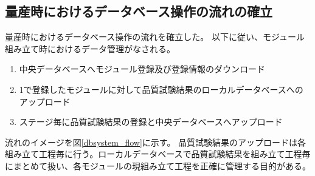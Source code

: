 \subsection{量産時におけるデータベース操作の流れの確立}
量産時におけるデータベース操作の流れを確立した。
以下に従い、モジュール組み立て時におけるデータ管理がなされる。
\begin{enumerate}
  \item 中央データベースへモジュール登録及び登録情報のダウンロード
  \item 1で登録したモジュールに対して品質試験結果のローカルデータベースへのアップロード
  \item ステージ毎に品質試験結果の登録と中央データベースへアップロード
\end{enumerate}

流れのイメージを図\ref{dbsystem_flow}に示す。
品質試験結果のアップロードは各組み立て工程毎に行う。ローカルデータベースで品質試験結果を組み立て工程毎にまとめて扱い、各モジュールの現組み立て工程を正確に管理する目的がある。
